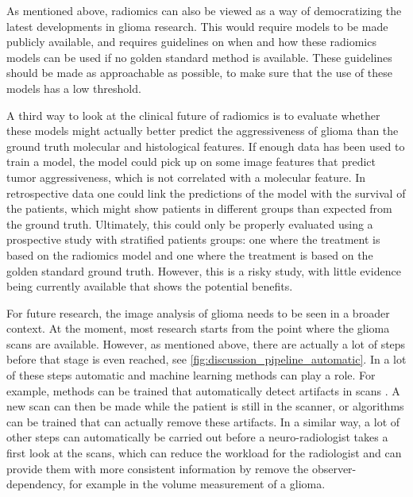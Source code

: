 As mentioned above, radiomics can also be viewed as a way of democratizing the latest  developments in glioma research.
This would require models to be made publicly available, and requires guidelines on when and how these radiomics models can be used if no golden standard method is available.
These guidelines should be made as approachable as possible, to make sure that the use of these models has a low threshold.

A third way to look at the clinical future of radiomics is to evaluate whether these models might actually better predict the aggressiveness of \gls{glioma} than the ground truth molecular and histological features.
If enough data has been used to train a model, the model could pick up on some image features that predict \gls{tumor} aggressiveness, which is not correlated with a molecular feature.
In retrospective data one could link the predictions of the model with the survival of the patients, which might show patients in different groups than expected from the ground truth.
Ultimately, this could only be properly evaluated using a prospective study with stratified patients groups: one where the treatment is based on the radiomics model and one where the treatment is based on the golden standard ground truth.
However, this is a risky study, with little evidence being currently available that shows the potential benefits.

For future research, the image analysis of glioma needs to be seen in a broader context.
At the moment, most research starts from the point where the glioma scans are available.
However, as mentioned above, there are actually a lot of steps before that stage is even reached, see \cref{fig:discussion_pipeline_automatic}.
In a lot of these steps automatic and machine learning methods can play a role.
For example, methods can be trained that automatically detect artifacts in scans \autocite{kustner2018artifacts}.
A new scan can then be made while the patient is still in the scanner, or algorithms can be trained that can actually remove these artifacts.
In a similar way, a lot of other steps can automatically be carried out before a neuro-radiologist takes a first look at the scans, which can reduce the workload for the radiologist and can provide them with more consistent information by remove the observer-dependency, for example in the volume measurement of a \gls{glioma}.


